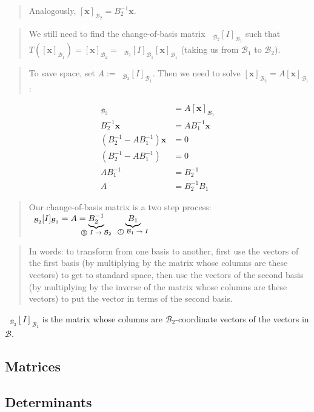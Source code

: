 \documentclass[a4paper]{article}
\newcommand{\Ubr}[2]{\underbrace{ #1 }_{\mathclap{\text{ #2 }}}}
\newcommand{\inv}{^{-1}}
\newcommand{\todobox}{\textcolor{red}{\fbox{\phantom{--}}}}
\newcommand{\x}{\textbf{x}}
\newcommand{\Bcal}{\mathcal{B}}
\begin{document}
\begin{quote}Analogously, $[\x]_{\Bcal_2} = B_2\inv \x$.\end{quote}
\begin{quote}We still need to find the change-of-basis matrix $\phantom{a}_{\Bcal_2}[I]_{\Bcal_1}$ such that $T([\x]_{\Bcal_1})=[\x]_{\Bcal_2}=\phantom{a}_{\Bcal_2}[I]_{\Bcal_1} [\x]_{\Bcal_1}$ (taking us from $\Bcal_1$ to $\Bcal_2$).\end{quote}
\begin{quote}To save space, set $A:= \phantom{a}_{\Bcal_2}[I]_{\Bcal_1}$. Then we need to solve $[\x]_{\Bcal_2} = A [\x]_{\Bcal_1}$: \end{quote}
                     \begin{align*}
                     [\x]_{\Bcal_2} &= A [\x]_{\Bcal_1} \\
                     B_2\inv \x &= A B_1\inv \x \\
                     (B_2\inv - AB_1\inv)\x &= 0 \\
                     (B_2\inv - AB_1\inv) &= 0 \\
                     AB_1\inv &= B_2\inv \\
                     A &= B_2\inv B_1
                     \end{align*}
\begin{quote}Our change-of-basis matrix is a two step process: $\phantom{a}_{\Bcal_2}[I]_{\Bcal_1} = A = \Ubr{B_2\inv}{\textcircled{\tiny 2} $I \rightarrow \Bcal_2$}\phantom{ccccc} \Ubr{B_1}{\textcircled{\tiny 1} $\Bcal_1 \rightarrow I$}$\end{quote}
\begin{quote}In words: to transform from one basis to another, first use the vectors of the first basis (by multiplying by the matrix whose columns are these vectors) to get to standard space, then use the vectors of the second basis (by multiplying by the inverse of the matrix whose columns are these vectors) to put the vector in terms of the second basis. \end{quote}
$\phantom{a}_{\Bcal_2}[I]_{\Bcal_1}$ is the matrix whose columns are $\Bcal_2$-coordinate vectors of the vectors in $\Bcal$.
\subsection{Matrices}
\todobox
\subsection{Determinants}
\todobox
\end{document}
